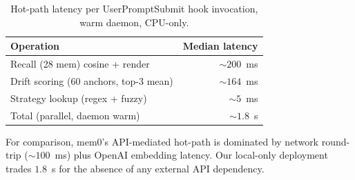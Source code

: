 \begin{table}[h]
\centering
\caption{Hot-path latency per UserPromptSubmit hook invocation,
warm daemon, CPU-only.}
\label{tab:latency}
\begin{tabular}{lr}
\toprule
Operation & Median latency \\
\midrule
Recall (28 mem) cosine + render          & $\sim 200$~ms \\
Drift scoring (60 anchors, top-3 mean)   & $\sim 164$~ms \\
Strategy lookup (regex + fuzzy)          & $\sim 5$~ms \\
Total (parallel, daemon warm)            & $\sim 1.8$~s \\
\bottomrule
\end{tabular}
\end{table}

For comparison, mem0's API-mediated hot-path is dominated by
network round-trip ($\sim 100$~ms) plus OpenAI embedding latency.
Our local-only deployment trades $1.8$~s for the absence of any
external API dependency.
